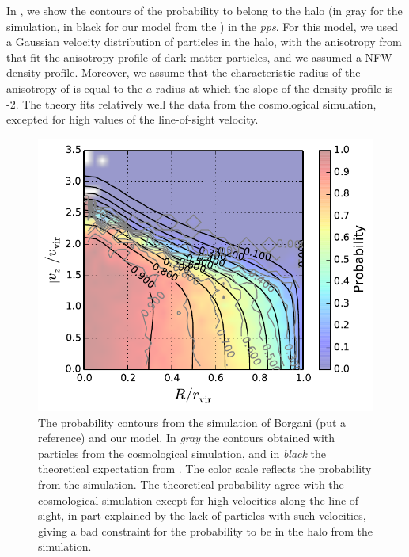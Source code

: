 In , we show the contours of the probability to
belong to the halo (in gray for the simulation, in black for our model from the
) in the \emph{pps}. For this model, we used a
Gaussian velocity distribution of particles in the halo, with the anisotropy
from \citet{ML+05} that fit the anisotropy profile of dark matter particles,
and we assumed a NFW density profile. Moreover, we assume that the
characteristic radius of the anisotropy of \citet{ML+05} is equal to the $a$
radius at which the slope of the density profile is -2. The theory fits
relatively well the data from the cosmological simulation, excepted for high
values of the line-of-sight velocity.
%
\begin{figure}[ht]
    \centering
    \includegraphics[width=0.6\linewidth]{figures/maggie/probabilities.pdf}
    \caption{The probability contours from the simulation of Borgani (put a
        reference) and our model. In \emph{gray} the contours obtained with
        particles from the cosmological simulation, and in \emph{black} the
        theoretical expectation from . The color
        scale reflects the probability from the simulation. The theoretical
        probability agree with the cosmological simulation except for high
        velocities along the line-of-sight, in part explained by the lack of
        particles with such velocities, giving a bad constraint for the
        probability to be in the halo from the simulation.
\label{fig:probabilities}}
\end{figure}

